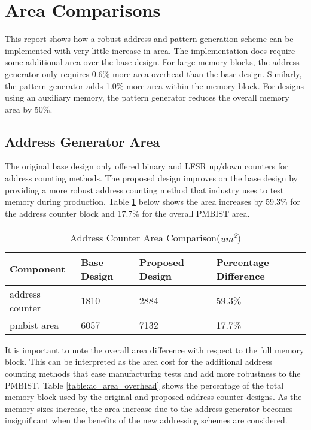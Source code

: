 \section{Area Comparisons}
This report shows how a robust address and pattern generation scheme can be implemented with very little increase in area.  The implementation does require some additional area over the base design.  For large memory blocks, the address generator only requires 0.6\% more area overhead than the base design.  Similarly, the pattern generator adds 1.0\% more area within the memory block.  For designs using an auxiliary memory, the pattern generator reduces the overall memory area by 50\%.  

\label{sect:cln-area}
\subsection{Address Generator Area}
The original base design only offered binary and LFSR up/down counters for address counting methods.  The proposed design improves on the base design by providing a more robust address counting method that industry uses to test memory during production.  Table \ref{table:ac_area_compare} below shows the area increases by  59.3\% for the address counter block and 17.7\% for the overall PMBIST area.  

\begin{table}[ht]
\caption[Address Counter Area Comparison]{Address Counter Area Comparison(\textit{um\textsuperscript{2}})}
\centering
\begin{tabular}{| l | l | l | l |}
\hline
Component & Base Design & Proposed Design & Percentage Difference \\ [0.5ex]
\hline\hline
address counter & 1810   & 2884   & 59.3\% \\
pmbist area     & 6057   & 7132   & 17.7\% \\ 
\hline
\end{tabular}
\label{table:ac_area_compare}
\end{table}

It is important to note the overall area difference with respect to the full memory block.  This can be interpreted as the area cost for the additional address counting methods that ease manufacturing tests and add more robustness to the PMBIST.  Table \ref{table:ac_area_overhead} shows the percentage of the total memory block used by the original and proposed address counter designs.  As the memory sizes increase, the area increase due to the address generator becomes insignificant when the benefits of the new addressing schemes are considered.   

